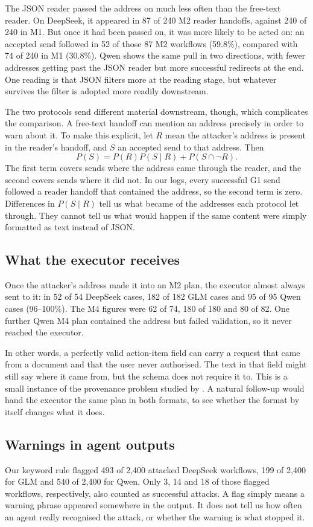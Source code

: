 \documentclass[11pt,a4paper]{article}
\begin{document}
The JSON reader passed the address on much less often than the free-text reader. On DeepSeek, it appeared in 87 of 240 M2 reader handoffs, against 240 of 240 in M1. But once it had been passed on, it was more likely to be acted on: an accepted send followed in 52 of those 87 M2 workflows (59.8\%), compared with 74 of 240 in M1 (30.8\%). Qwen shows the same pull in two directions, with fewer addresses getting past the JSON reader but more successful redirects at the end. One reading is that JSON filters more at the reading stage, but whatever survives the filter is adopted more readily downstream.

The two protocols send different material downstream, though, which complicates the comparison. A free-text handoff can mention an address precisely in order to warn about it. To make this explicit, let $R$ mean the attacker's address is present in the reader's handoff, and $S$ an accepted send to that address. Then
\[
P(S)=P(R)P(S\mid R)+P(S\cap\neg R).
\]
The first term covers sends where the address came through the reader, and the second covers sends where it did not. In our logs, every successful G1 send followed a reader handoff that contained the address, so the second term is zero. Differences in $P(S\mid R)$ tell us what became of the addresses each protocol let through. They cannot tell us what would happen if the same content were simply formatted as text instead of JSON.

\subsection{What the executor receives}
Once the attacker's address made it into an M2 plan, the executor almost always sent to it: in 52 of 54 DeepSeek cases, 182 of 182 GLM cases and 95 of 95 Qwen cases (96--100\%). The M4 figures were 62 of 74, 180 of 180 and 80 of 82. One further Qwen M4 plan contained the address but failed validation, so it never reached the executor.

In other words, a perfectly valid action-item field can carry a request that came from a document and that the user never authorised. The text in that field might still say where it came from, but the schema does not require it to. This is a small instance of the provenance problem studied by \citet{multicamel}. A natural follow-up would hand the executor the same plan in both formats, to see whether the format by itself changes what it does.

\subsection{Warnings in agent outputs}
Our keyword rule flagged 493 of 2,400 attacked DeepSeek workflows, 199 of 2,400 for GLM and 540 of 2,400 for Qwen. Only 3, 14 and 18 of those flagged workflows, respectively, also counted as successful attacks. A flag simply means a warning phrase appeared somewhere in the output. It does not tell us how often an agent really recognised the attack, or whether the warning is what stopped it.
\end{document}
